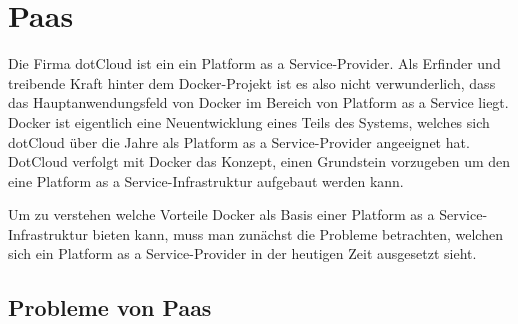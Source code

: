 \section{Paas}
\label{sec:paas}
Die Firma dotCloud ist ein ein Platform as a Service-Provider. Als Erfinder und treibende Kraft hinter dem Docker-Projekt ist es also nicht verwunderlich, dass das Hauptanwendungsfeld von Docker im Bereich von Platform as a Service liegt.
Docker ist eigentlich eine Neuentwicklung eines Teils des Systems, welches sich dotCloud über die Jahre als 
Platform as a Service-Provider angeeignet hat. DotCloud verfolgt mit Docker das Konzept, einen Grundstein vorzugeben um den eine Platform as a Service-Infrastruktur aufgebaut werden kann.\cite[Zeit 18:24]{hykes_introduction_2013}

Um zu verstehen welche Vorteile Docker als Basis einer Platform as a Service-Infrastruktur bieten kann, muss man zunächst die Probleme betrachten, welchen sich ein Platform as a Service-Provider in der heutigen Zeit ausgesetzt sieht.

\subsection{Probleme von Paas}
\label{sec:probleme_von_paas}

